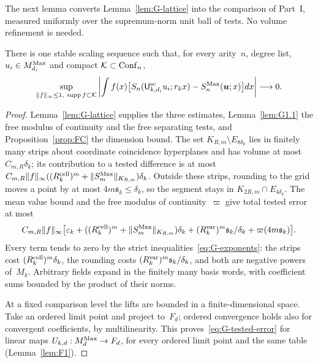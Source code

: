 The next lemma converts Lemma~\ref{lem:G-lattice} into the comparison of Part~I, measured uniformly over the supremum-norm unit ball of tests. No volume refinement is needed.
\begin{lemma}\label{lem:G2.1}
There is one stable scaling sequence such that, for every arity~$n$, degree list, $u_i\in M_{d_i}^{\mathrm{Max}}$ and compact $\mathcal K\subset\mathrm{Conf}_{n}$,
\begin{equation*}
\sup_{\|f\|_\infty\le1,\ \operatorname{supp}f\subset\mathcal K}\left|\int f(x)\bigl[S_n(\scaleframe{k}{d_i}u_i;r_kx)-\maxwellcorr_n(\boldsymbol u;x)\bigr]dx\right|\longrightarrow0.
\end{equation*}
\end{lemma}
\begin{proof}
Lemma~\ref{lem:G-lattice} supplies the three estimates, Lemma~\ref{lem:G1.1} the free modulus of continuity and the free separating tests, and Proposition~\ref{prop:FC} the dimension bound. The set $K_{R,m}\setminus E_{8\delta_k}$ lies in finitely many strips about coordinate coincidence hyperplanes and has volume at most $C_{m,R}\delta_k$; its contribution to a tested difference is at most $C_{m,R}\|f\|_\infty((R^{\rm cell}_k)^m+\|S^{\mathrm{Max}}_m\|_{K_{R,m}})\delta_k$. Outside these strips, rounding to the grid moves a point by at most $4m\mathfrak s_k\le\delta_k$, so the segment stays in $K_{2R,m}\cap E_{4\delta_k}$. The mean value bound and the free modulus of continuity~$\varpi$ give total tested error at most
\begin{equation}\label{eq:G-tested-error}
C_{m,R}\|f\|_\infty
 \bigl[\varepsilon_k+((R^{\rm cell}_k)^m+\|S^{\mathrm{Max}}_m\|_{K_{R,m}})\delta_k
       +(R^{\rm var}_k)^m\mathfrak s_k/\delta_k+\varpi(4m\mathfrak s_k)\bigr].
\end{equation}
Every term tends to zero by the strict inequalities~\eqref{eq:G-exponents}: the strips cost $(R^{\rm cell}_k)^m\delta_k$, the rounding costs $(R^{\rm var}_k)^m\mathfrak s_k/\delta_k$, and both are negative powers of~$M_k$. Arbitrary fields expand in the finitely many basis words, with coefficient sums bounded by the product of their norms.

At a fixed comparison level the lifts are bounded in a finite-dimensional space. Take an ordered limit point and project to~$F_d$; ordered convergence holds also for convergent coefficients, by multilinearity. This proves~\eqref{eq:G-tested-error} for linear maps $U_{k,d}:M_{d}^{\mathrm{Max}}\to F_d$, for every ordered limit point and the same table (Lemma~\ref{lem:F1}).


\end{proof}
